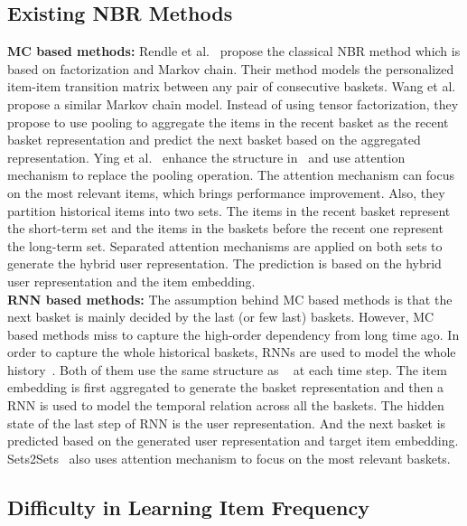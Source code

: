 \documentclass[sigconf]{acmart}
\begin{document}
\subsection{Existing  NBR  Methods}
\label{sec:existing_NB}
\textbf{MC based methods:}
Rendle et al.~\cite{rendle2010factorizing} propose the classical NBR method which is based on factorization and Markov chain. Their method models the  personalized  item-item transition matrix between any pair of  consecutive baskets. Wang et al.~\cite{wang2015learning} propose a similar Markov chain model. Instead of using tensor  factorization, they  propose to use pooling to  aggregate the items  in the recent  basket as the recent  basket  representation and  predict the next  basket based on the aggregated  representation.  Ying et al.~\cite{ying2018sequential} enhance the structure  in~\cite{wang2015learning} and use   attention mechanism  to replace the  pooling operation.  The attention mechanism can focus on the most relevant items, which brings  performance  improvement. Also, they partition  historical items  into two sets. The items in the recent  basket represent  the short-term set and the items in the baskets before the recent one represent  the long-term set. Separated attention mechanisms are applied on both  sets to generate the hybrid user  representation. The prediction is based on the hybrid user representation and the item embedding. \\
\textbf{RNN based methods:} The assumption behind MC based methods is that the next basket is mainly decided by the last (or few last) baskets. However, MC based methods miss to capture the high-order dependency from long time ago. In order to capture the whole historical baskets,  RNNs are used to model the whole  history~\cite{yu2016dynamic}\cite{hu2019sets2sets}. Both of them use the same structure as ~\cite{wang2015learning} at each time step. The item embedding is first aggregated to generate the basket representation and then a RNN is used to model the temporal relation across all the  baskets. The hidden state of the last step of RNN is the user representation. And the next basket is predicted based on the generated user representation and target item embedding. Sets2Sets~\cite{hu2019sets2sets} also uses attention  mechanism to focus  on the most relevant baskets. 


\subsection{Difficulty in Learning Item Frequency}
\end{document}
